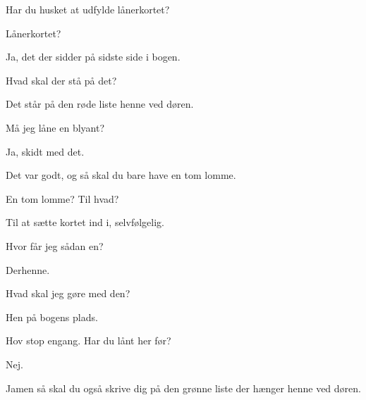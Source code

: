 \documentclass[a4paper,11pt]{article}
\begin{document}
\begin{sketch}
   Har du husket at udfylde lånerkortet?

   Lånerkortet?

   Ja, det der sidder på sidste side i bogen.

   Hvad skal der stå på det?

   Det står på den røde liste henne ved døren.

   Må jeg låne en blyant?

   Ja, skidt med det.


   Det var godt, og så skal du bare have en tom lomme.

   En tom lomme?  Til hvad?

   Til at sætte kortet ind i, selvfølgelig.

   Hvor får jeg sådan en?

   Derhenne.

   Hvad skal jeg gøre med den?

   Hen på bogens plads.


   Hov stop engang.  Har du lånt her før?

   Nej.

   Jamen så skal du også skrive dig på den grønne liste der
  hænger henne ved døren.


\end{sketch}
\end{document}
